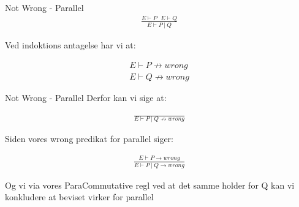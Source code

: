 \begin{frame}{Not Wrong - Parallel}
	\begin{align*}
		\frac{E \vdash P\ \ \ E \vdash Q}{E \vdash P\ |\ Q}
	\end{align*}

	Ved indoktions antagelse har vi at:

	\begin{align*}
		E \vdash P \nrightarrow wrong \\
		E \vdash Q \nrightarrow wrong
	\end{align*}
\end{frame}

\begin{frame}{Not Wrong - Parallel}
	Derfor kan vi sige at:

	\begin{align*}
		\frac{}{E \vdash P\ |\ Q \nrightarrow wrong}
	\end{align*}

	Siden vores wrong predikat for parallel siger:

	\begin{align*}
		\frac{E \vdash P \rightarrow wrong}{E \vdash P\ |\ Q \rightarrow wrong}
	\end{align*}

	Og vi via vores ParaCommutative regl ved at det samme holder for Q kan vi konkludere at beviset virker for parallel
\end{frame}
